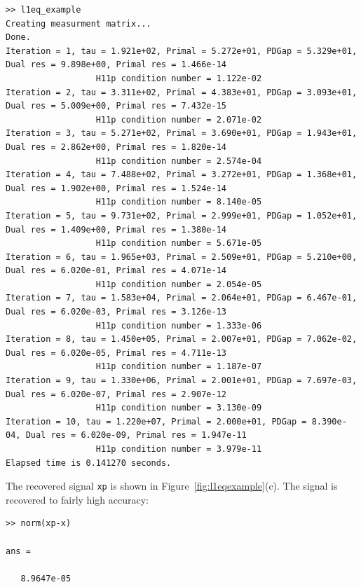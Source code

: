 \documentclass{article}
\newcommand{\<}{\langle}
\renewcommand{\>}{\rangle}
\begin{document}
{\tiny
\begin{verbatim}
>> l1eq_example
Creating measurment matrix...
Done.
Iteration = 1, tau = 1.921e+02, Primal = 5.272e+01, PDGap = 5.329e+01, Dual res = 9.898e+00, Primal res = 1.466e-14
                  H11p condition number = 1.122e-02
Iteration = 2, tau = 3.311e+02, Primal = 4.383e+01, PDGap = 3.093e+01, Dual res = 5.009e+00, Primal res = 7.432e-15
                  H11p condition number = 2.071e-02
Iteration = 3, tau = 5.271e+02, Primal = 3.690e+01, PDGap = 1.943e+01, Dual res = 2.862e+00, Primal res = 1.820e-14
                  H11p condition number = 2.574e-04
Iteration = 4, tau = 7.488e+02, Primal = 3.272e+01, PDGap = 1.368e+01, Dual res = 1.902e+00, Primal res = 1.524e-14
                  H11p condition number = 8.140e-05
Iteration = 5, tau = 9.731e+02, Primal = 2.999e+01, PDGap = 1.052e+01, Dual res = 1.409e+00, Primal res = 1.380e-14
                  H11p condition number = 5.671e-05
Iteration = 6, tau = 1.965e+03, Primal = 2.509e+01, PDGap = 5.210e+00, Dual res = 6.020e-01, Primal res = 4.071e-14
                  H11p condition number = 2.054e-05
Iteration = 7, tau = 1.583e+04, Primal = 2.064e+01, PDGap = 6.467e-01, Dual res = 6.020e-03, Primal res = 3.126e-13
                  H11p condition number = 1.333e-06
Iteration = 8, tau = 1.450e+05, Primal = 2.007e+01, PDGap = 7.062e-02, Dual res = 6.020e-05, Primal res = 4.711e-13
                  H11p condition number = 1.187e-07
Iteration = 9, tau = 1.330e+06, Primal = 2.001e+01, PDGap = 7.697e-03, Dual res = 6.020e-07, Primal res = 2.907e-12
                  H11p condition number = 3.130e-09
Iteration = 10, tau = 1.220e+07, Primal = 2.000e+01, PDGap = 8.390e-04, Dual res = 6.020e-09, Primal res = 1.947e-11
                  H11p condition number = 3.979e-11
Elapsed time is 0.141270 seconds.    
\end{verbatim}
}
The recovered signal \texttt{xp} is shown in Figure~\ref{fig:l1eqexample}(c).  The signal is recovered to fairly high accuracy:
\begin{verbatim}
>> norm(xp-x)

ans =

   8.9647e-05
   
\end{verbatim}
\end{document}
